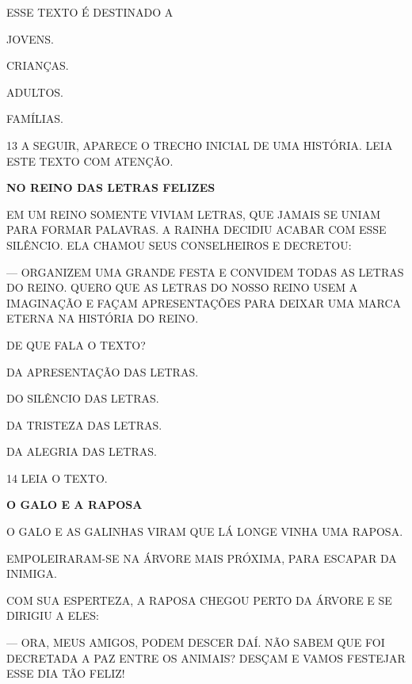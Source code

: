 ESSE TEXTO É DESTINADO A

\begin{multicols}{2}
\begin{escolha}%
\item JOVENS.

\item CRIANÇAS.

\item ADULTOS.

\item FAMÍLIAS.
\end{escolha}
\end{multicols}

\num{13} A SEGUIR, APARECE O TRECHO INICIAL DE UMA HISTÓRIA. LEIA ESTE TEXTO COM ATENÇÃO.

\begin{myquote}
\textbf{NO REINO DAS LETRAS FELIZES}

EM UM REINO SOMENTE 
VIVIAM LETRAS, QUE JAMAIS SE UNIAM 
PARA FORMAR PALAVRAS. A RAINHA DECIDIU ACABAR COM ESSE 
SILÊNCIO. ELA CHAMOU SEUS CONSELHEIROS E DECRETOU:

--- ORGANIZEM UMA GRANDE FESTA E CONVIDEM TODAS AS 
LETRAS DO REINO. QUERO QUE AS LETRAS DO NOSSO REINO USEM 
A IMAGINAÇÃO E FAÇAM APRESENTAÇÕES PARA DEIXAR UMA MARCA 
ETERNA NA HISTÓRIA DO REINO.

\end{myquote}

DE QUE FALA O TEXTO?

\begin{escolha}
\item DA APRESENTAÇÃO DAS LETRAS.

\item DO SILÊNCIO DAS LETRAS.

\item DA TRISTEZA DAS LETRAS. 

\item DA ALEGRIA DAS LETRAS.
\end{escolha}

\num{14} LEIA O TEXTO.

\begin{myquote}
\textbf{O GALO E A RAPOSA}

O GALO E AS GALINHAS VIRAM QUE LÁ LONGE VINHA UMA RAPOSA.

EMPOLEIRARAM-SE NA ÁRVORE MAIS PRÓXIMA, PARA ESCAPAR DA INIMIGA.

COM SUA ESPERTEZA, A RAPOSA CHEGOU PERTO DA ÁRVORE E
SE DIRIGIU A ELES:

--- ORA, MEUS AMIGOS, PODEM DESCER DAÍ. NÃO SABEM QUE
FOI DECRETADA A PAZ ENTRE OS ANIMAIS? DESÇAM E VAMOS FESTEJAR ESSE
DIA TÃO FELIZ!

\end{myquote}

